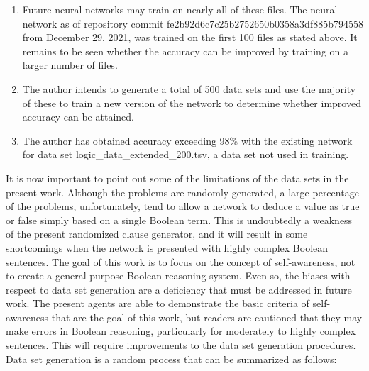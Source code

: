 \documentclass[
]{article}
\begin{document}
\begin{enumerate}
\def\labelenumi{\arabic{enumi}.}
\item
  Future neural networks may train on nearly all of these files. The
  neural network as of repository commit
  fe2b92d6c7c25b2752650b0358a3df885b794558 from December 29, 2021, was
  trained on the first 100 files as stated above. It remains to be seen
  whether the accuracy can be improved by training on a larger number of
  files.
\item
  The author intends to generate a total of 500 data sets and use the
  majority of these to train a new version of the network to determine
  whether improved accuracy can be attained.
\item
  The author has obtained accuracy exceeding 98\% with the existing
  network for data set logic\_data\_extended\_200.tsv, a data set not
  used in training.
\end{enumerate}

It is now important to point out some of the limitations of the data
sets in the present work. Although the problems are randomly generated,
a large percentage of the problems, unfortunately, tend to allow a
network to deduce a value as true or false simply based on a single
Boolean term. This is undoubtedly a weakness of the present randomized
clause generator, and it will result in some shortcomings when the
network is presented with highly complex Boolean sentences. The goal of
this work is to focus on the concept of self-awareness, not to create a
general-purpose Boolean reasoning system. Even so, the biases with
respect to data set generation are a deficiency that must be addressed
in future work. The present agents are able to demonstrate the basic
criteria of self-awareness that are the goal of this work, but readers
are cautioned that they may make errors in Boolean reasoning,
particularly for moderately to highly complex sentences. This will
require improvements to the data set generation procedures. Data set
generation is a random process that can be summarized as follows:
\end{document}
